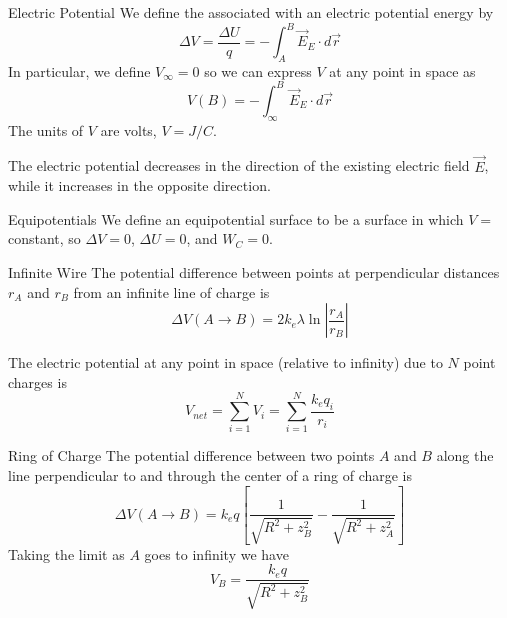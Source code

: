 \documentclass[12pt]{report}
\begin{document}
\begin{defn}{Electric Potential}{}
        We define the  associated with an electric potential energy by \begin{equation}
                \Delta V = \frac{\Delta U}{q} = -\int_A^B\vec{E}_E \cdot d\vec{r}
        \end{equation}
        In particular, we define $V_{\infty} = 0$ so we can express $V$ at any point in space as \begin{equation}
                V(B) = -\int_{\infty}^B\vec{E}_E \cdot d\vec{r}
        \end{equation}
        The units of $V$ are volts, $V = J/C$.
\end{defn}

\begin{rmk}{}{}
        The electric potential decreases in the direction of the existing electric field $\vec{E}$, while it increases in the opposite direction.
\end{rmk}


\begin{defn}{Equipotentials}{}
        We define an equipotential surface to be a surface in which $V = $ constant, so $\Delta V = 0$, $\Delta U = 0$, and $W_C = 0$.
\end{defn}


\begin{prop}{Infinite Wire}{}
        The potential difference between points at perpendicular distances $r_A$ and $r_B$ from an infinite line of charge is \begin{equation}
                \Delta V(A\rightarrow B) = 2k_e\lambda\ln\left|\frac{r_A}{r_B}\right|
        \end{equation}
\end{prop}

\begin{rmk}{}{}
        The electric potential at any point in space (relative to infinity) due to $N$ point charges is \begin{equation}
                V_{net} = \sum_{i=1}^NV_i = \sum_{i=1}^N\frac{k_eq_i}{r_i}
        \end{equation}
\end{rmk}


\begin{prop}{Ring of Charge}{}
        The potential difference between two points $A$ and $B$ along the line perpendicular to and through the center of a ring of charge is \begin{equation}
                \Delta V(A\rightarrow B) = k_eq\left[\frac{1}{\sqrt{R^2+z_B^2}} - \frac{1}{\sqrt{R^2+z_A^2}}\right]
        \end{equation}
        Taking the limit as $A$ goes to infinity we have \begin{equation}
                V_B = \frac{k_eq}{\sqrt{R^2+z_B^2}}
        \end{equation}
\end{prop}
\end{document}
